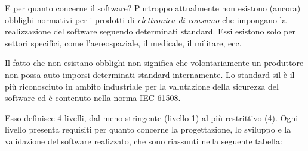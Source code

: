 \documentclass[12pt,a4paper,twoside,titlepage]{book}
\begin{document}
E per quanto concerne il software? Purtroppo attualmente non esistono (ancora) obblighi normativi per 
i prodotti di \textit{elettronica di consumo} che impongano la realizzazione del software seguendo determinati 
standard. Essi esistono solo per settori specifici, come l'aereospaziale, il medicale, il militare, ecc. 

Il fatto che non esistano obblighi non significa che volontariamente un produttore non possa auto imporsi determinati 
standard internamente. Lo standard \acrfull{sil} è il più riconosciuto in ambito industriale per la valutazione 
della sicurezza del software ed è contenuto nella norma IEC 61508. 

Esso definisce 4 livelli, dal meno stringente (livello 1) al più restrittivo (4). Ogni 
livello presenta requisiti per quanto concerne la progettazione, lo sviluppo e la validazione 
del software realizzato, che sono riassunti nella seguente tabella:
\end{document}

